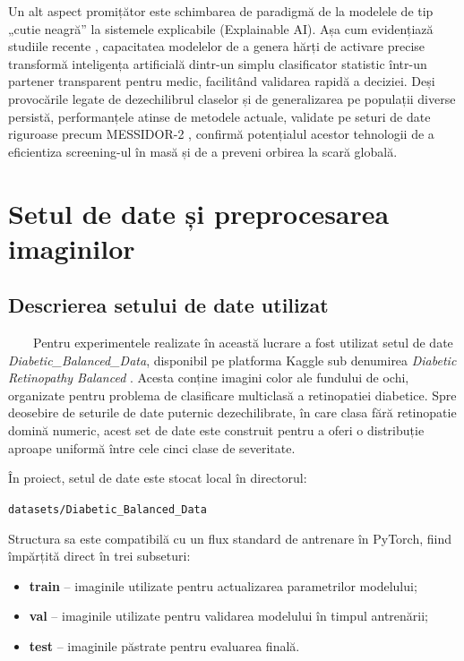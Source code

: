 \documentclass[12pt, a4paper, oneside, romanian]{teza-upb}
\begin{document}
Un alt aspect promițător este schimbarea de paradigmă de la modelele de tip „cutie neagră” la
sistemele explicabile (Explainable AI). Așa cum evidențiază studiile recente \cite{9_chetoui2020explainable}, capacitatea modelelor de
a genera hărți de activare precise transformă inteligența artificială dintr-un simplu clasificator statistic
într-un partener transparent pentru medic, facilitând validarea rapidă a deciziei. Deși provocările legate
de dezechilibrul claselor și de generalizarea pe populații diverse persistă, performanțele atinse de
metodele actuale, validate pe seturi de date riguroase precum MESSIDOR-2 \cite{9_chetoui2020explainable}, confirmă potențialul
acestor tehnologii de a eficientiza screening-ul în masă și de a preveni orbirea la scară globală.

\chapter{Setul de date și preprocesarea imaginilor}

\section{Descrierea setului de date utilizat}

\ \ \ \ Pentru experimentele realizate în această lucrare a fost utilizat setul de date \textit{Diabetic\_Balanced\_Data}, disponibil pe platforma Kaggle sub denumirea \textit{Diabetic Retinopathy Balanced} \cite{24_kaggle_diabetic_balanced}. Acesta conține imagini color ale fundului de ochi, organizate pentru problema de clasificare multiclasă a retinopatiei diabetice. Spre deosebire de seturile de date puternic dezechilibrate, în care clasa fără retinopatie domină numeric, acest set de date este construit pentru a oferi o distribuție aproape uniformă între cele cinci clase de severitate.
\bigskip

În proiect, setul de date este stocat local în directorul:

\begin{center}
\texttt{datasets/Diabetic\_Balanced\_Data}
\end{center}

Structura sa este compatibilă cu un flux standard de antrenare în PyTorch, fiind împărțită direct în trei subseturi:

\begin{itemize}
  \item \textbf{train} -- imaginile utilizate pentru actualizarea parametrilor modelului;
  \item \textbf{val} -- imaginile utilizate pentru validarea modelului în timpul antrenării;
  \item \textbf{test} -- imaginile păstrate pentru evaluarea finală.
\end{itemize}
\end{document}
